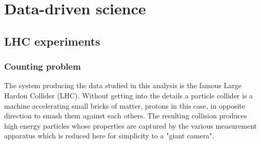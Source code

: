 
\chapter{Data-driven science}  %
\label{chap:intro_stat}
\ifpdf
    \graphicspath{{Chapter1/Figs/Raster/}{Chapter1/Figs/PDF/}{Chapter1/Figs/}}
\else
    \graphicspath{{Chapter1/Figs/Vector/}{Chapter1/Figs/}}
\fi














\section{LHC experiments} %
\label{sec:lhc_experiments}







\subsection{Counting problem} %
\label{sub:counting_problem}

The system producing the data studied in this analysis is the famous Large Hardon Collider (LHC).
Without getting into the details a particle collider is a machine accelerating small bricks of matter, protons in this case, in opposite direction to smash them against each others.
The resulting collision produces high energy particles whose properties are captured by the various measurement apparatus which is reduced here for simplicity to a "giant camera".

